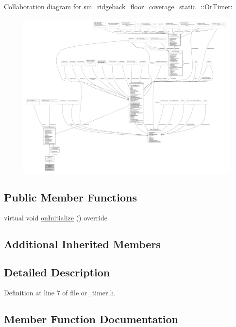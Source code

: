 Collaboration diagram for sm\+\_\+ridgeback\+\_\+floor\+\_\+coverage\+\_\+static\+\_\+:\+:Or\+Timer\+:
\nopagebreak
\begin{figure}[H]
\begin{center}
\leavevmode
\includegraphics[width=350pt]{classsm__ridgeback__floor__coverage__static__1_1_1OrTimer__coll__graph}
\end{center}
\end{figure}
\subsection*{Public Member Functions}
\begin{DoxyCompactItemize}
\item 
virtual void \hyperlink{classsm__ridgeback__floor__coverage__static__1_1_1OrTimer_ab7e12a43aebecc3e6981b33552703dd1}{on\+Initialize} () override
\end{DoxyCompactItemize}
\subsection*{Additional Inherited Members}


\subsection{Detailed Description}


Definition at line 7 of file or\+\_\+timer.\+h.



\subsection{Member Function Documentation}
\mbox{\label{classsm__ridgeback__floor__coverage__static__1_1_1OrTimer_ab7e12a43aebecc3e6981b33552703dd1}} 
